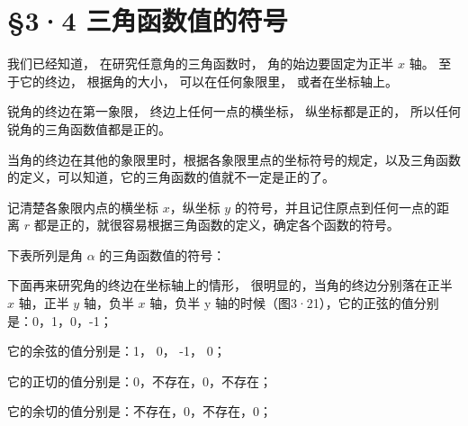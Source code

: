 \section{§3·4 三角函数值的符号}

我们已经知道， 在研究任意角的三角函数时， 角的始边要固定为正半 \(x\)
轴。 至于它的终边， 根据角的大小， 可以在任何象限里， 或者在坐标轴上。

锐角的终边在第一象限， 终边上任何一点的横坐标， 纵坐标都是正的，
所以任何锐角的三角函数值都是正的。

当角的终边在其他的象限里时，根据各象限里点的坐标符号的规定，以及三角函数的定义，可以知道，它的三角函数的值就不一定是正的了。

记清楚各象限内点的横坐标 \(x\)，纵坐标 \(y\)
的符号，并且记住原点到任何一点的距离 \(r\)
都是正的，就很容易根据三角函数的定义，确定各个函数的符号。

下表所列是角 \(\alpha\) 的三角函数值的符号：

{\centering
\footnotesize\setlength{\tabcolsep}{2.6pt}%
\par
}

下面再来研究角的终边在坐标轴上的情形， 很明显的，当角的终边分别落在正半
\(x\) 轴，正半 \(y\) 轴，负半 \(x\) 轴，负半 y 轴的时候（图3·21），它的正弦的值分别是：0，1，0，-1；

它的余弦的值分别是：1， 0， -1， 0；

它的正切的值分别是：0，不存在，0，不存在；

它的余切的值分别是：不存在，0，不存在，0；

